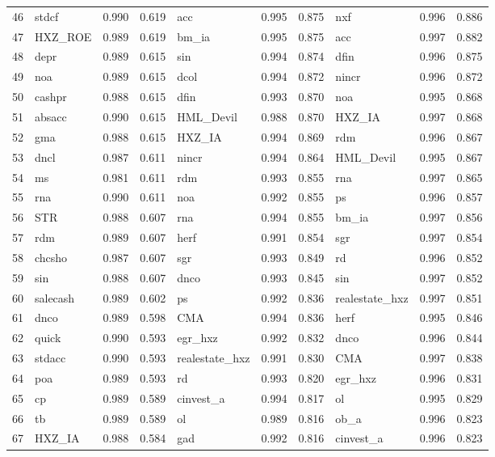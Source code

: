 \begin{landscape}
\begin{footnotesize}
\begin{longtable}{l|lcc|lcc|lcc}
  46 & stdcf & 0.990 & 0.619 & acc & 0.995 & 0.875 & nxf & 0.996 & 0.886 \\ 
  47 & HXZ\_ROE & 0.989 & 0.619 & bm\_ia & 0.995 & 0.875 & acc & 0.997 & 0.882 \\ 
  48 & depr & 0.989 & 0.615 & sin & 0.994 & 0.874 & dfin & 0.996 & 0.875 \\ 
  49 & noa & 0.989 & 0.615 & dcol & 0.994 & 0.872 & nincr & 0.996 & 0.872 \\ 
  50 & cashpr & 0.988 & 0.615 & dfin & 0.993 & 0.870 & noa & 0.995 & 0.868 \\ 
  51 & absacc & 0.990 & 0.615 & HML\_Devil & 0.988 & 0.870 & HXZ\_IA & 0.997 & 0.868 \\ 
  52 & gma & 0.988 & 0.615 & HXZ\_IA & 0.994 & 0.869 & rdm & 0.996 & 0.867 \\ 
  53 & dncl & 0.987 & 0.611 & nincr & 0.994 & 0.864 & HML\_Devil & 0.995 & 0.867 \\ 
  54 & ms & 0.981 & 0.611 & rdm & 0.993 & 0.855 & rna & 0.997 & 0.865 \\ 
  55 & rna & 0.990 & 0.611 & noa & 0.992 & 0.855 & ps & 0.996 & 0.857 \\ 
  56 & STR & 0.988 & 0.607 & rna & 0.994 & 0.855 & bm\_ia & 0.997 & 0.856 \\ 
  57 & rdm & 0.989 & 0.607 & herf & 0.991 & 0.854 & sgr & 0.997 & 0.854 \\ 
  58 & chcsho & 0.987 & 0.607 & sgr & 0.993 & 0.849 & rd & 0.996 & 0.852 \\ 
  59 & sin & 0.988 & 0.607 & dnco & 0.993 & 0.845 & sin & 0.997 & 0.852 \\ 
  60 & salecash & 0.989 & 0.602 & ps & 0.992 & 0.836 & realestate\_hxz & 0.997 & 0.851 \\ 
  61 & dnco & 0.989 & 0.598 & CMA & 0.994 & 0.836 & herf & 0.995 & 0.846 \\ 
  62 & quick & 0.990 & 0.593 & egr\_hxz & 0.992 & 0.832 & dnco & 0.996 & 0.844 \\ 
  63 & stdacc & 0.990 & 0.593 & realestate\_hxz & 0.991 & 0.830 & CMA & 0.997 & 0.838 \\ 
  64 & poa & 0.989 & 0.593 & rd & 0.993 & 0.820 & egr\_hxz & 0.996 & 0.831 \\ 
  65 & cp & 0.989 & 0.589 & cinvest\_a & 0.994 & 0.817 & ol & 0.995 & 0.829 \\ 
  66 & tb & 0.989 & 0.589 & ol & 0.989 & 0.816 & ob\_a & 0.996 & 0.823 \\ 
  67 & HXZ\_IA & 0.988 & 0.584 & gad & 0.992 & 0.816 & cinvest\_a & 0.996 & 0.823 \\ 

\end{longtable}
\end{footnotesize}
\end{landscape}

